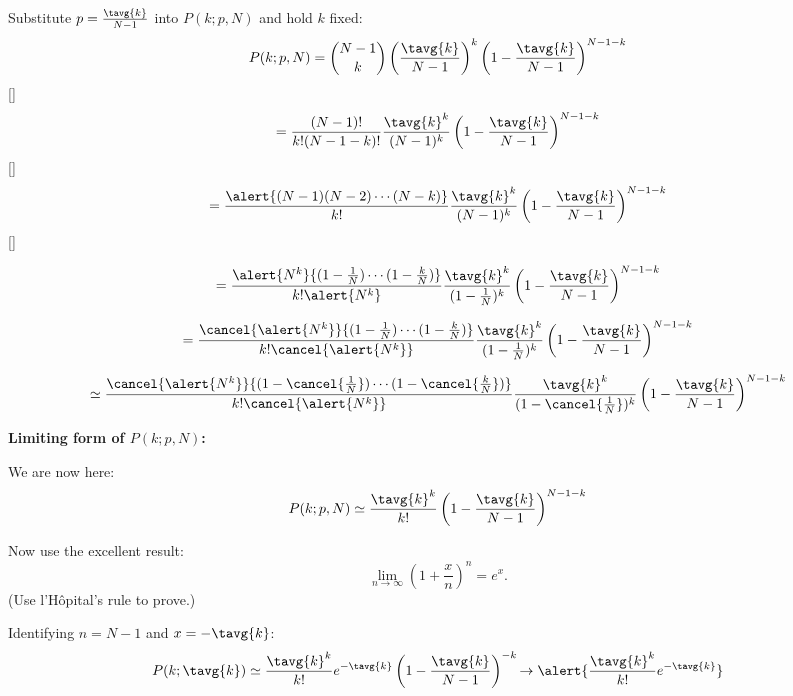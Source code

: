 \begin{frame}[label=]
\begin{frame}[label=]
\begin{frame}[label=]
\begin{frame}[label=]
\begin{frame}[label=]
\begin{frame}[label=]
\begin{frame}[label=]
    
      Substitute $p = \frac{\tavg{k}}{N-1}$ into $P(k;p,N)$
      and hold $k$ fixed:
      $$
      P(k;p,N) = \binom{N-1}{k} 
      \left(
      \frac{\tavg{k}}{N-1}
      \right)^k 
      \left(
      1-\frac{\tavg{k}}{N-1}
      \right)^{N-1-k}
      $$
    []
      $$
      = 
      \frac{(N-1)!}
      {k!(N-1-k)!}
      \frac{\tavg{k}^k}{(N-1)^k}
      \left(
      1-\frac{\tavg{k}}{N-1}
      \right)^{N-1-k}
      $$
    []
      $$
      = 
      \frac{\alert{(N-1)(N-2)\cdots(N-k)}}
      {k!}
      \frac{\tavg{k}^k}{(N-1)^k}
      \left(
      1-\frac{\tavg{k}}{N-1}
      \right)^{N-1-k}
      $$
    []
              
      $$
      =
      \frac{\alert{N^k}
        {(1-\frac{1}{N})\cdots(1-\frac{k}{N})}}
      {k! \alert{N^k}}
      \frac{\tavg{k}^k}{(1-\frac{1}{N})^k}
      \left(
      1-\frac{\tavg{k}}{N-1}
      \right)^{N-1-k}
      $$
        
      $$
      =
      \frac{\cancel{\alert{N^k}}
        {(1-{\frac{1}{N}})\cdots(1-\frac{k}{N})}}
      {k! \cancel{\alert{N^k}}}
      \frac{\tavg{k}^k}{(1-\frac{1}{N})^k}
      \left(
      1-\frac{\tavg{k}}{N-1}
      \right)^{N-1-k}
      $$
        
      $$
      \simeq
      \frac{\cancel{\alert{N^k}}
        {(1-\cancel{\frac{1}{N}})\cdots(1-\cancel{\frac{k}{N}})}}
      {k! \cancel{\alert{N^k}}}
      \frac{\tavg{k}^k}{(1-\cancel{\frac{1}{N}})^k}
      \left(
      1-\frac{\tavg{k}}{N-1}
      \right)^{N-1-k}
      $$
          


\begin{frame}[label=]
  \textbf{Limiting form of $P(k;p,N)$:}
  \small

  
  
    We are now here:
    $$
    P(k;p,N)
    \simeq
    \frac{\tavg{k}^k}
    {k!}
    \left(
      1-\frac{\tavg{k}}{N-1}
    \right)^{N-1-k}
    $$
  
    Now use the excellent result:
    $$
    \lim_{n \rightarrow \infty}
    \left(
      1+\frac{x}{n}
    \right)^n
    = e^{x}.
    $$
    {
      (Use l'H\^{o}pital's rule to prove.)
    }
  
    Identifying $n=N-1$ and $x=-\tavg{k}$:
    $$
    P(k;\tavg{k})
    \simeq
    \frac{\tavg{k}^k}
    {k!}
    e^{-\tavg{k}}
    \left(
      1-\frac{\tavg{k}}{N-1}
    \right)^{-k}
    {
      \rightarrow
      \alert{
        \frac{\tavg{k}^k}
        {k!}
        e^{-\tavg{k}}
      }
    }
    $$
  

\end{frame}
\end{frame}
\end{frame}
\end{frame}
\end{frame}
\end{frame}
\end{frame}
\end{frame}
